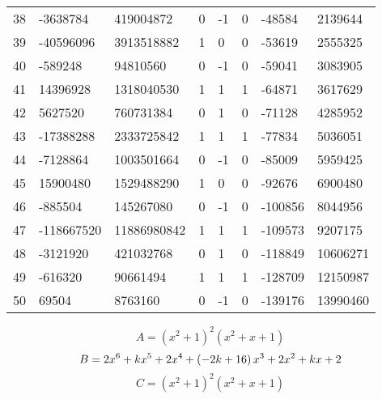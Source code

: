 \documentclass{amsart}
\begin{document}
\begin{longtable}{|l|l|l|lllll|}
38&-3638784&419004872&0&-1&0&-48584&2139644\\
39&-40596096&3913518882&1&0&0&-53619&2555325\\
40&-589248&94810560&0&-1&0&-59041&3083905\\
41&14396928&1318040530&1&1&1&-64871&3617629\\
42&5627520&760731384&0&1&0&-71128&4285952\\
43&-17388288&2333725842&1&1&1&-77834&5036051\\
44&-7128864&1003501664&0&-1&0&-85009&5959425\\
45&15900480&1529488290&1&0&0&-92676&6900480\\
46&-885504&145267080&0&-1&0&-100856&8044956\\
47&-118667520&11886980842&1&1&1&-109573&9207175\\
48&-3121920&421032768&0&1&0&-118849&10606271\\
49&-616320&90661494&1&1&1&-128709&12150987\\
50&69504&8763160&0&-1&0&-139176&13990460\\
\hline
\end{longtable}
$$A=(x^2
 + 1)^{2}(x^2
 + x
 + 1)$$
$$B=2\*x^6
 + k\*x^5
 + 2\*x^4
 + \left(-2\*k
 + 16\right) \*x^3
 + 2\*x^2
 + k\*x
 + 2$$
$$C=(x^2
 + 1)^{2}(x^2
 + x
 + 1)$$
\end{document}
